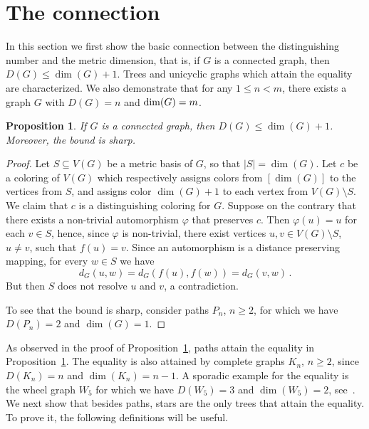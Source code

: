\documentclass[12pt]{article}
\newtheorem{proposition}[theorem]{Proposition}
\begin{document}
\section{The connection} 
\label{sec:connection}

In this section we first show the basic connection between the distinguishing number and the metric dimension, that is, if $G$ is a connected graph, then $D(G)\le \dim(G) + 1$. Trees and unicyclic graphs which attain the equality are characterized. We also demonstrate that for any $1\leq n< m$, there exists a graph $G$ with $D(G)=n$ and ${\rm dim}(G)=m$.

\begin{proposition}\label{prop:main}
If $G$ is a connected graph, then $D(G)\leq \dim(G)+1$. Moreover, the bound is sharp. 
\end{proposition}

\begin{proof}
Let $S \subseteq V(G)$ be a metric basis of $G$, so that $|S| = \dim(G)$. Let $c$ be a coloring of $V(G)$ which respectively assigns colors from $[\dim(G)]$ to the vertices from $S$, and assigns color $\dim(G)+1$ to each vertex from $V(G)\setminus S$. We claim that $c$ is a distinguishing coloring for $G$. Suppose on the contrary that there exists a non-trivial automorphism $\varphi$ that preserves $c$. Then $\varphi(u) = u$ for each $v\in S$, hence, since $\varphi$ is non-trivial, there exist vertices $u,v \in V(G)\setminus S$, $u\ne v$, such that $f(u)=v$. Since an automorphism is a distance preserving mapping, for every $w \in S$ we have 
$$ d_G(u, w) = d_G(f(u), f(w)) = d_G(v, w)\,.$$ 
But then $S$ does not resolve $u$ and $v$, a contradiction.

To see that the bound is sharp, consider paths $P_n$, $n\geq 2$, for which we have $D(P_n) = 2$ and $\dim(G) = 1$.
\end{proof}

As observed in the proof of Proposition~\ref{prop:main}, paths attain the equality in Proposition~\ref{prop:main}. The equality is also attained by complete graphs $K_n$, $n\ge 2$, since $D(K_n) = n$ and $\dim(K_n) = n-1$. A sporadic example for the equality is the wheel graph $W_5$ for which we have $D(W_5) = 3$ and $\dim(W_5) = 2$, see~\cite{shan-2002}. We next show that besides paths, stars are the only trees that attain the equality. To prove it, the following definitions will be useful. 
\end{document}
